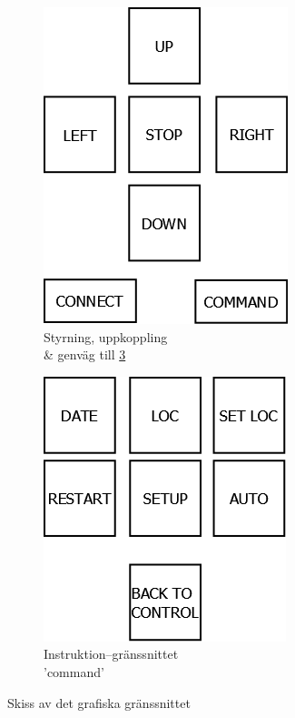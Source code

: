 \documentclass{article}
\begin{document}
        \begin{figure}[b!]
            \centering
            \begin{subfigure}[b]{0.4\textwidth}
                \centering
                \includegraphics[scale=0.3]{img/styrkors}
                \caption{Styrning, uppkoppling \\ \& genväg till \ref{fig:command}}
                \label{fig:cross}
            \end{subfigure}
            \begin{subfigure}[b]{0.4\textwidth}
                \centering
                \includegraphics[scale=0.3]{img/command}
                \caption{Instruktion--gränssnittet \\ 'command'}
                \label{fig:command}
            \end{subfigure}
            \caption{Skiss av det grafiska gränssnittet}
        \end{figure}
\end{document}
